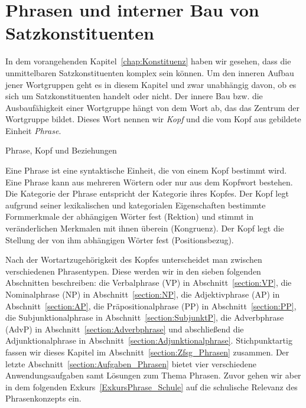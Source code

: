 \chapter{Phrasen und interner Bau von Satzkonstituenten}\label{chap:Phrasen}

In dem vorangehenden Kapitel~\ref{chap:Konstituenz} haben wir gesehen, dass die unmittelbaren Satzkonstituenten komplex sein können. Um den inneren Aufbau jener Wortgruppen geht es in diesem Kapitel und zwar unabhängig davon, ob es sich um Satzkonstituenten handelt oder nicht. Der innere Bau bzw. die Ausbaufähigkeit einer Wortgruppe hängt von dem Wort ab, das das Zentrum der Wortgruppe bildet. Dieses Wort nennen wir \textit{Kopf} und die vom Kopf aus gebildete Einheit \textit{Phrase}. 

\begin{Definition}{Phrase, Kopf und Beziehungen}
    
\noindent Eine Phrase ist eine syntaktische Einheit, die von einem Kopf bestimmt wird. Eine Phrase kann aus mehreren Wörtern oder nur aus dem Kopfwort bestehen. Die Kategorie der Phrase entspricht der Kategorie ihres Kopfes. Der Kopf legt aufgrund seiner lexikalischen und kategorialen Eigenschaften bestimmte Formmerkmale der abhängigen Wörter fest (Rektion) und stimmt in veränderlichen Merkmalen mit ihnen überein (Kongruenz). Der Kopf legt die Stellung der von ihm abhängigen Wörter fest (Positionsbezug).     
\end{Definition}


Nach der Wortartzugehörigkeit des Kopfes unterscheidet man zwischen verschiedenen Phrasentypen. Diese werden wir in den sieben folgenden Abschnitten beschreiben: die Verbalphrase (VP) in Abschnitt~\ref{section:VP}, die Nominalphrase (NP) in Abschnitt~\ref{section:NP}, die Adjektivphrase (AP) in Abschnitt~\ref{section:AP}, die Präpositionalphrase (PP) in Abschnitt~\ref{section:PP}, die Subjunktionalphrase in Abschnitt~\ref{section:SubjunktP}, die Adverbphrase (AdvP) in Abschnitt~\ref{section:Adverbphrase} und abschließend die Adjunktionalphrase in Abschnitt~\ref{section:Adjunktionalphrase}. Stichpunktartig fassen wir dieses Kapitel im Abschnitt~\ref{section:Zfsg_Phrasen} zusammen. Der letzte Abschnitt~\ref{section:Aufgaben_Phrasen} bietet vier verschiedene Anwendungsaufgaben samt Lösungen zum Thema Phrasen. Zuvor gehen wir aber in dem folgenden Exkurs~\ref{ExkursPhrase_Schule} auf die schulische Relevanz des Phrasenkonzepts ein.  



